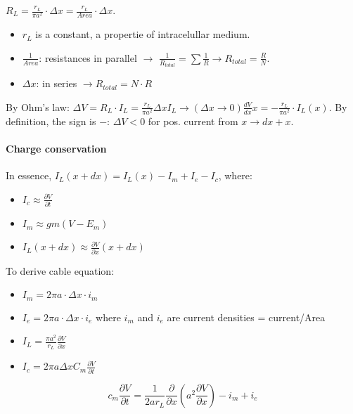 \documentclass[main]{subfiles}
\begin{document}
$R_L = \frac{r_L}{\pi a^2} \cdot \Delta x = \frac{r_L}{Area} \cdot \Delta x$.

\begin{itemize}
\item $r_L$ is a constant, a propertie of intracelullar medium.
\item $\frac{1}{Area}$: resistances in parallel $\rightarrow$ $\frac{1}{R_{total}} = \sum \frac{1}{R} \rightarrow R_{total} = \frac{R}{N}$.
\item $\Delta x$: in series $\rightarrow R_{total} = N \cdot R$
\end{itemize}

By Ohm's law: $\Delta V = R_L \cdot I_L = \frac{r_L}{\pi a^2} \Delta x I_L \rightarrow	(\Delta x \to 0) \frac{dV}{dx} x = - \frac{r_L}{\pi a^2} \cdot I_L(x)$. By definition, the sign is $-$: $\Delta V < 0$ for pos. current from $x \rightarrow dx + x$.

\paragraph{Charge conservation}

\begin{figure}[H]
	\centering
\end{figure}

In essence, $I_L(x + dx) = I_L(x) - I_m + I_e - I_c$, where:
\begin{itemize}
\item $I_c \approx \frac{\partial V}{\partial t}$
\item $I_m \approx gm (V - E_m)$
\item $I_L(x+dx) \approx \frac{\partial V}{\partial x}(x+dx)$
\end{itemize}

To derive cable equation:
\begin{itemize}
\item $I_m = 2 \pi a \cdot \Delta x \cdot i_m$
\item $I_e = 2 \pi a \cdot \Delta x \cdot i_e$
\subitem where $i_m$ and $i_e$ are current densities = current/Area
\item $I_L = \frac{\pi a^2}{r_L} \frac{\partial V}{\partial x}$
\item $I_c = 2 \pi a \Delta x C_m \frac{\partial V}{\partial t}$
\end{itemize}

\[c_m\frac{\partial V}{\partial t} = \frac{1}{2ar_L}\frac{\partial}{\partial x}(a^2\frac{\partial V}{\partial x})-i_m+i_e\]
\end{document}
